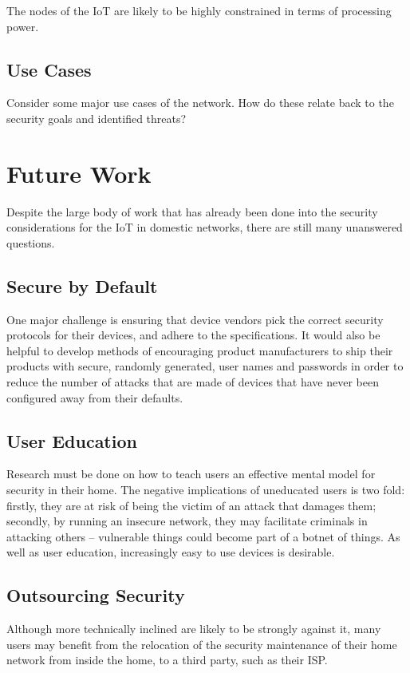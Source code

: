 \documentclass[10pt,journal,compsoc]{IEEEtran}
\begin{document}
The nodes of the IoT are likely to be highly constrained in terms of processing
power. 

\subsection{Use Cases}
Consider some major use cases of the network.
How do these relate back to the security goals and identified threats?


\section{Future Work}
Despite the large body of work that has already been done into the security
considerations for the IoT in domestic networks, there are still many
unanswered questions. 

\subsection{Secure by Default}
One major challenge is ensuring that device vendors pick the correct security
protocols for their devices, and adhere to the specifications. It would also be
helpful to develop methods of encouraging product manufacturers to ship their
products with secure, randomly generated, user names and passwords in order to
reduce the number of attacks that are made of devices that have never been
configured away from their defaults.

\subsection{User Education}
Research must be done on how to teach users an effective mental model for
security in their home. The negative implications of uneducated users is two
fold: firstly, they are at risk of being the victim of an attack that damages
them; secondly, by running an insecure network, they may facilitate criminals
in attacking others -- vulnerable things could become part of a botnet of
things. As well as user education, increasingly easy to use devices is
desirable. 

\subsection{Outsourcing Security}
Although more technically inclined are likely to be strongly against it, many
users may benefit from the relocation of the security maintenance of their home
network from inside the home, to a third party, such as their ISP. 
\end{document}
